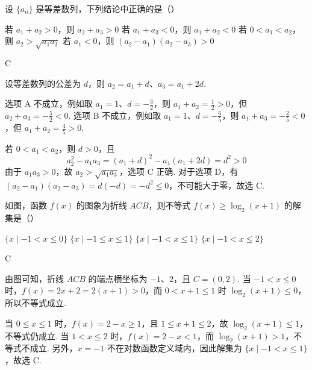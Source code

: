 \begin{problem}
设 \(\{a_{n}\}\) 是等差数列，下列结论中正确的是（\quad）

\choices
    {若 \( a_{1} + a_{2} > 0 \)，则 \( a_{2} + a_{3} > 0 \)}
    {若 \( a_{1} + a_{3} < 0 \)，则 \( a_{1} + a_{2} < 0 \)}
    {若 \(0 < a_{1} < a_{2}\)，则 \(a_{2} > \sqrt{a_{1}a_{3}}\)}
    {若 \(a_{1} < 0\)，则 \((a_{2} - a_{1})(a_{2} - a_{3}) > 0\)}

\begin{answer}
C
\end{answer}

\begin{solution}
设等差数列的公差为 \(d\)，则 \(a_2=a_1+d\)、\(a_3=a_1+2d\).

选项 A 不成立，例如取 \(a_1=1\)、\(d=-\frac{3}{2}\)，则 \(a_1+a_2=\frac{1}{2}>0\)，但 \(a_2+a_3=-\frac{5}{2}<0\). 选项 B 不成立，例如取 \(a_1=1\)、\(d=-\frac{6}{5}\)，则 \(a_1+a_3=-\frac{2}{5}<0\)，但 \(a_1+a_2=\frac{4}{5}>0\).

若 \(0<a_1<a_2\)，则 \(d>0\)，且
\[
a_2^2-a_1a_3=(a_1+d)^2-a_1(a_1+2d)=d^2>0
\]
由于 \(a_1a_3>0\)，故 \(a_2>\sqrt{a_1a_3}\)，选项 C 正确. 对于选项 D，有 \((a_2-a_1)(a_2-a_3)=d(-d)=-d^2\leqslant0\)，不可能大于零，故选 C.
\end{solution}
\end{problem}

\begin{problem}
如图，函数 \( f(x) \) 的图象为折线 \(ACB\)，则不等式 \( f(x) \geqslant \log_2(x + 1) \) 的解集是（\quad）


\choices
    {\( \{x\mid-1<x\leq0\} \)}
    {\(\{x\mid -1\leqslant x\leqslant 1\}\)}
    {\(\{x\mid -1 < x\leqslant 1\}\)}
    {\(\{x\mid -1 < x\leqslant 2\}\)}

\begin{answer}
C
\end{answer}

\begin{solution}
由图可知，折线 \(ACB\) 的端点横坐标为 \(-1\)、\(2\)，且 \(C=(0,2)\). 当 \(-1<x\leqslant0\) 时，\(f(x)=2x+2=2(x+1)>0\)，而 \(0<x+1\leqslant1\) 时 \(\log_2(x+1)\leqslant0\)，所以不等式成立.

当 \(0\leqslant x\leqslant1\) 时，\(f(x)=2-x\geqslant1\)，且 \(1\leqslant x+1\leqslant2\)，故 \(\log_2(x+1)\leqslant1\)，不等式仍成立. 当 \(1<x\leqslant2\) 时，\(f(x)=2-x<1\)，而 \(\log_2(x+1)>1\)，不等式不成立. 另外，\(x=-1\) 不在对数函数定义域内，因此解集为 \(\{x\mid-1<x\leqslant1\}\)，故选 C.
\end{solution}
\end{problem}

